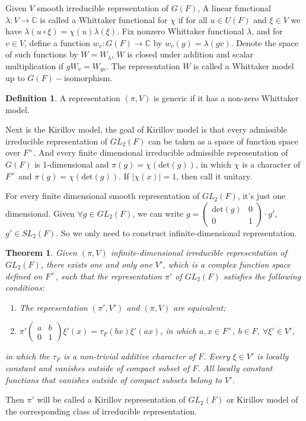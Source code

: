 \documentclass[12pt,a4paper,english]{article}
\theoremstyle{plain}
\newtheorem{thm}{Theorem}[section]
\theoremstyle{definition}
\newtheorem{defi}{Definition}
\begin{document}
Given $V$ smooth irreducible representation of $G(F)$, A linear functional $\lambda: V\rightarrow \mathbb{C}$ is called a Whittaker functional for $\chi$ if for all $u\in U(F)$ and $\xi\in V$ we have $\lambda(u\circ\xi)=\chi(u)\lambda(\xi)$. Fix nonzero Whittaker functional $\lambda$, and for $v\in V$, define a function $w_{v}: G(F)\rightarrow \mathbb{C}$ by $w_{v}(g)=\lambda(gv)$. Denote the space of such functions by $W=W_{\lambda}$, $W$ is closed under addition and scalar multiplication if $gW_{v}=W_{gv}$. The representation $W$ is called a Whittaker model up to $G(F)-$isomorphism.

\begin{defi}
A representation $(\pi, V)$ is  generic if it has a non-zero Whittaker model. 
\end{defi}

Next is the Kirillov model, the goal of Kirillov model is that every admissible irreducible representation of $GL_{2}(F)$ can be taken as a space of function space over $F^{\times}$. And every finite dimensional irreducible admissible representation of $G(F)$ is 1-dimensional and $\pi(g)=\chi(\text{det}(g))$, in which $\chi$ is a character of $F^{\times}$ and $\pi(g)=\chi(\text{det}(g))$. If $|\chi(x)|=1$, then call it unitary. 

For every finite dimensional smooth representation of $GL_{2}(F)$, it's just one dimensional. Given $\forall g\in GL_{2}(F)$, we can write $g=\begin{pmatrix}
\text{det}(g) & 0\\
0 & 1
\end{pmatrix}\cdot  g'$,\ $g'\in SL_{2}(F)$. So we only need to construct infinite-dimensional representation. 
\begin{thm}
Given $(\pi, V)$ infinite-dimensional irreducible representation of $GL_{2}(F)$, there exists one and only one $V'$, which is a complex function space defined on $F^{\times}$, such that the representation $\pi'$ of $GL_{2}(F)$ satisfies the following conditions:
\begin{enumerate}
    \item The representation $(\pi',V')$ and $(\pi,V)$ are equivalent;
    \item $\pi'\begin{pmatrix}
    a& b\\
    0&1
    \end{pmatrix}\xi'(x)=\tau_{F}(bx)\xi'(ax)$, in which $a, x\in F^{\times},\ b\in F,\ \forall\xi'\in V'$,
\end{enumerate}
in which the $\tau_{F}$ is a non-trivial additive character of $F$. Every $\xi\in V'$ is locally constant and vanishes outside of compact subset of $F$. All locally constant functions that vanishes outside of compact subsets belong to $V'$. 

\end{thm}
Then $\pi'$ will be called a Kirillov representation of $GL_{2}(F)$ or Kirillov model of the corresponding class of irreducible representation.
\end{document}
